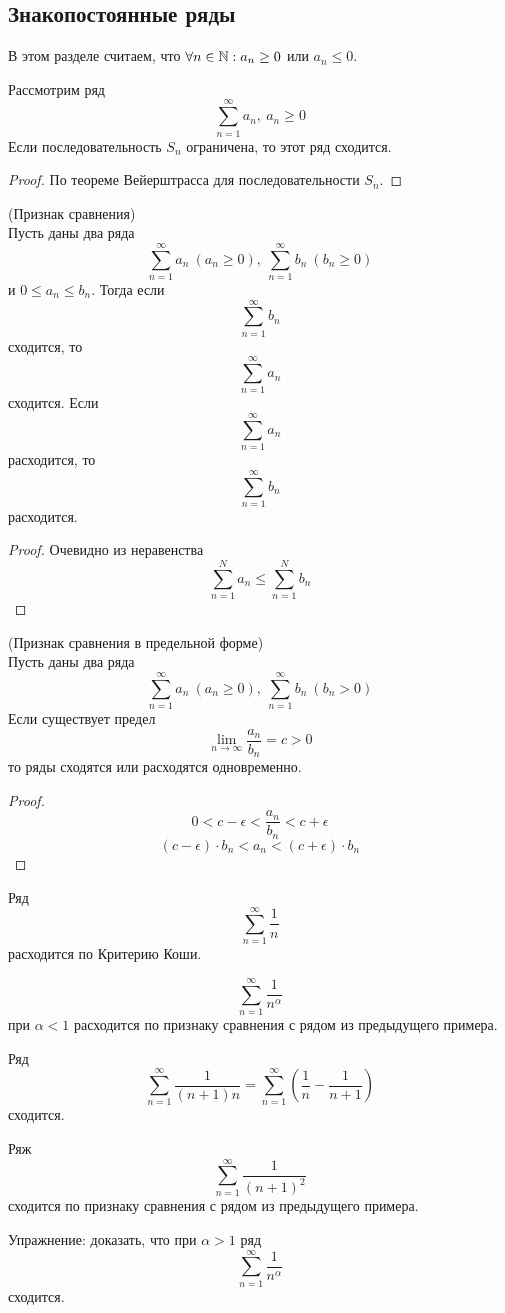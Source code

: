 \subsection{Знакопостоянные ряды}
В этом разделе считаем, что $\forall n\in \mathbb{N}: a_n\geq 0$ или $a_n\leq 0$.
\begin{theorem}
    Рассмотрим ряд
    \[\sum_{n=1}^{\infty}a_n,\ a_n\geq 0\]
    Если последовательность $S_n$ ограничена, то этот ряд сходится.
\end{theorem}
\begin{proof}
    По теореме Вейерштрасса для последовательности $S_n$.
\end{proof}
\begin{theorem} (Признак сравнения)\\
    Пусть даны два ряда
    \[\sum_{n=1}^{\infty}a_n\ (a_n\geq 0),\ \sum_{n=1}^{\infty}b_n\ (b_n\geq 0)\]
    и $0\leq a_n\leq b_n$. Тогда если 
    \[\sum_{n=1}^{\infty}b_n\]
    сходится, то
    \[\sum_{n=1}^{\infty}a_n\]
    сходится. Если 
    \[\sum_{n=1}^{\infty}a_n\]
    расходится, то 
    \[\sum_{n=1}^{\infty}b_n\]
    расходится.
\end{theorem}
\begin{proof} Очевидно из неравенства
    \[\sum_{n=1}^{N}a_n\leq \sum_{n=1}^{N}b_n\]
\end{proof}
\begin{theorem} (Признак сравнения в предельной форме)\\
    Пусть даны два ряда
    \[\sum_{n=1}^{\infty}a_n\ (a_n\geq 0),\ \sum_{n=1}^{\infty}b_n\ (b_n > 0)\]
    Если существует предел
    \[\lim\limits_{n\to\infty}\frac{a_n}{b_n}=c>0\]
    то ряды сходятся или расходятся одновременно.
\end{theorem}
\begin{proof}
    \[0<c-\epsilon<\frac{a_n}{b_n}<c+\epsilon\]
    \[(c-\epsilon)\cdot b_n<a_n<(c+\epsilon)\cdot b_n\]
\end{proof}
\begin{example}
    Ряд
    \[\sum_{n=1}^{\infty}\frac{1}{n}\]
    расходится по Критерию Коши.
\end{example}
\begin{example}
    \[\sum_{n=1}^{\infty}\frac{1}{n^{\alpha}}\]
    при $\alpha<1$ расходится по признаку сравнения с рядом из предыдущего примера.
\end{example}
\begin{example} Ряд
    \[\sum_{n=1}^{\infty}\frac{1}{(n+1)n}=\sum_{n=1}^{\infty}\left(\frac{1}{n}-\frac{1}{n+1}\right)\]
    сходится.
\end{example}
\begin{example} Ряж
    \[\sum_{n=1}^{\infty}\frac{1}{(n+1)^2}\]
    сходится по признаку сравнения с рядом из предыдущего примера.
\end{example}
\begin{example} Упражнение: доказать, что при $\alpha>1$ ряд
    \[\sum_{n=1}^{\infty}\frac{1}{n^{\alpha}}\]
    сходится.
\end{example}
